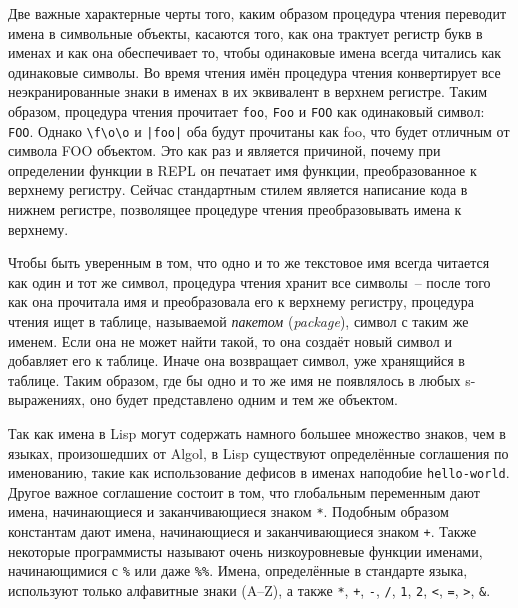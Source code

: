 Две важные характерные черты того, каким образом процедура чтения переводит имена в
символьные объекты, касаются того, как она трактует регистр букв в именах и как она
обеспечивает то, чтобы одинаковые имена всегда читались как одинаковые символы. Во время
чтения имён процедура чтения конвертирует все неэкранированные знаки в именах в их
эквивалент в верхнем регистре. Таким образом, процедура чтения прочитает \lstinline{foo},
\lstinline{Foo} и \lstinline{FOO} как одинаковый символ: \lstinline{FOO}. Однако
\lstinline!\f\o\o! и \lstinline!|foo|! оба 
будут прочитаны как foo, что будет отличным от символа FOO объектом. Это как раз и
является причиной, почему при определении функции в REPL он печатает имя функции,
преобразованное к верхнему регистру. Сейчас стандартным стилем является написание кода в
нижнем регистре, позволящее процедуре чтения преобразовывать имена к верхнему.

Чтобы быть уверенным в том, что одно и то же текстовое имя всегда читается как один и тот
же символ, процедура чтения хранит все символы~-- после того как она прочитала имя и
преобразовала его к верхнему регистру, процедура чтения ищет в таблице, называемой
\textit{пакетом} (\textit{package}), символ с таким же именем. Если она не может найти
такой, то она создаёт новый символ и добавляет его к таблице. Иначе она возвращает символ,
уже хранящийся в таблице. Таким образом, где бы одно и то же имя не появлялось в любых
s-выражениях, оно будет представлено одним и тем же объектом.

Так как имена в Lisp могут содержать намного большее множество знаков, чем в языках,
произошедших от Algol, в Lisp существуют определённые соглашения по именованию, такие как
использование дефисов в именах наподобие \lstinline{hello-world}. Другое важное соглашение
состоит в том, что глобальным переменным дают имена, начинающиеся и заканчивающиеся знаком
\lstinline{*}. Подобным образом константам дают имена, начи\-наю\-щие\-ся и заканчивающиеся знаком
\lstinline{+}. Также некоторые программисты называют очень низкоуровневые функции именами,
начинающимися с \lstinline!%! или даже \lstinline!%%!. Имена, определённые в стандарте
языка, используют только алфавитные знаки (A--Z), а также \lstinline{*}, \lstinline{+}, \lstinline{-},
\lstinline{/}, \lstinline{1}, \lstinline{2}, \lstinline{<}, \lstinline{=}, \lstinline{>}, \lstinline{&}.

